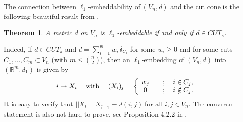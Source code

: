 \documentclass[12pt]{amsart}
\newtheorem{theorem}{Theorem}
\numberwithin{theorem}{section}
\theoremstyle{remark}
\begin{document}
The connection between $\ell_1$-embeddability of $(V_n,d)$ and the cut cone is the following beautiful result from \cite{Assouad}.
\begin{theorem} \label{Theorem about the equivalence of ell1-embeddability and belonging to the cut cone}
A metric $d$ on $V_n$ is $\ell_1$-embeddable if and only if $d\in CUT_n$. 
\end{theorem}
Indeed, if $d\in CUT_n$ and $d = \sum_{i=1}^m  w_i\, \delta_{C_i}$ for some $w_i\ge 0$ and for some cuts $C_1, \dots, C_m\subset V_n$ (with $m\le {n\choose 2} $), then an $\ell_1$-embedding of $(V_n,d)$ into $\left( \mathbb R^m, d_1\right)$ is given by
%
$$i\mapsto X_i \quad \text{ with } \quad (X_i)_j=\left\{ 
\begin{array}{cl}
w_j & \quad ; \quad i \in C_j, \cr 
0 & \quad ; \quad i \notin C_j. 	
\end{array} 
\right.  $$
%
It is easy to verify that $||X_i-X_j||_1 = d(i,j)$ for all $i,j \in V_n$. The converse statement is also not hard to prove, see Proposition 4.2.2 in \cite{DezaLaurentBook}.
\end{document}
